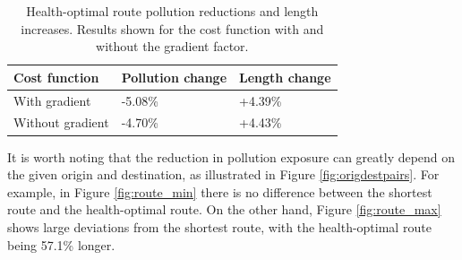 \documentclass[11pt,twosided,a4paper]{report}
\begin{document}
\begin{table}[!tbp]
  \centering
  \caption{Health-optimal route pollution reductions and length increases. Results shown for the cost function with and without the gradient factor.}
  \label{tab:pollution_reductions}
  \begin{tabular}{ l l l }
  \toprule
  Cost function & Pollution change & Length change \\ \midrule
  With gradient & -5.08\% & +4.39\% \\
  Without gradient & -4.70\% & +4.43\% \\ \bottomrule
  \end{tabular}
\end{table}


It is worth noting that the reduction in pollution exposure can greatly depend on the given origin and destination, as illustrated in Figure \ref{fig:origdestpairs}. For example, in Figure \ref{fig:route_min} there is no difference between the shortest route and the health-optimal route. On the other hand, Figure \ref{fig:route_max} shows large deviations from the shortest route, with the health-optimal route being 57.1\% longer.
\end{document}
